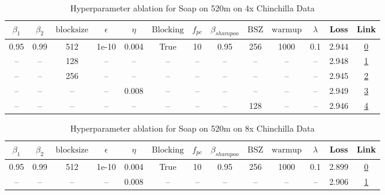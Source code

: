 \begin{table}[H]
\centering
\caption{Hyperparameter ablation for Soap on 520m on 4x Chinchilla Data}
\label{tab:ablation_soap_520m_4}
\begin{tabular}{ccccccccccccc}
\toprule
$\beta_1$ & $\beta_2$ & $\mathrm{block size}$ & $\epsilon$ & $\eta$ & $\mathrm{Blocking}$ & $f_{pc}$ & $\beta_{shampoo}$ & $\mathrm{BSZ}$ & $\mathrm{warmup}$ & $\lambda$ & Loss & Link \\
\midrule
0.95 & 0.99 & 512 & 1e-10 & 0.004 & True & 10 & 0.95 & 256 & 1000 & 0.1 & 2.944 & \href{https://wandb.ai/stanford-mercury/optimizer-scaling/runs/sweep-520m-42B-soapepde58c5lr0.004-wd0.1-minlr0-warmup1000-b10.9-c834a4}{0} \\
\midrule
-- & -- & 128 & -- & -- & -- & -- & -- & -- & -- & -- & 2.948 & \href{https://wandb.ai/stanford-mercury/optimizer-scaling/runs/sweep-520m-42B-soapedb348f5lr0.004-wd0.1-minlr0-warmup1000-b10.9-b0ebf2}{1} \\
-- & -- & 256 & -- & -- & -- & -- & -- & -- & -- & -- & 2.945 & \href{https://wandb.ai/stanford-mercury/optimizer-scaling/runs/sweep-520m-42B-soaped5aacdclr0.004-wd0.1-minlr0-warmup1000-b10.9-94f724}{2} \\
-- & -- & -- & -- & 0.008 & -- & -- & -- & -- & -- & -- & 2.949 & \href{https://wandb.ai/stanford-mercury/optimizer-scaling/runs/sweep-520m-42B-soapepef50b6lr0.008-wd0.1-minlr0-warmup1000-b10.9-0c8c99}{3} \\
-- & -- & -- & -- & -- & -- & -- & -- & 128 & -- & -- & 2.946 & \href{https://wandb.ai/stanford-mercury/optimizer-scaling/runs/sweep-520m-42B-soapepa7a19flr0.004-wd0.1-minlr0-warmup1000-b10.9-868eca}{4} \\
\bottomrule
\end{tabular}
\end{table}

\begin{table}[H]
\centering
\caption{Hyperparameter ablation for Soap on 520m on 8x Chinchilla Data}
\label{tab:ablation_soap_520m_8}
\begin{tabular}{ccccccccccccc}
\toprule
$\beta_1$ & $\beta_2$ & $\mathrm{block size}$ & $\epsilon$ & $\eta$ & $\mathrm{Blocking}$ & $f_{pc}$ & $\beta_{shampoo}$ & $\mathrm{BSZ}$ & $\mathrm{warmup}$ & $\lambda$ & Loss & Link \\
\midrule
0.95 & 0.99 & 512 & 1e-10 & 0.004 & True & 10 & 0.95 & 256 & 1000 & 0.1 & 2.899 & \href{https://wandb.ai/stanford-mercury/optimizer-scaling/runs/sweep-520m-85B-soapeaa7a19flr0.004-wd0.1-minlr0-warmup1000-b10.9-fe941f}{0} \\
\midrule
-- & -- & -- & -- & 0.008 & -- & -- & -- & -- & -- & -- & 2.906 & \href{https://wandb.ai/stanford-mercury/optimizer-scaling/runs/sweep-520m-85B-soapew298532lr0.008-wd0.1-minlr0-warmup1000-b10.9-59eeb6}{1} \\
\bottomrule
\end{tabular}
\end{table}

